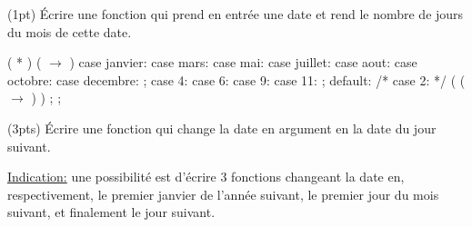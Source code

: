 \question (1pt) {\'E}crire une fonction  qui prend en
entr{\'e}e une date et rend le nombre de jours du mois de cette date.


\begin{petitsexemples}
\end{petitsexemples}

\begin{solution}
  \begin{Ccode}
    \ctab{}\cint 
    \ctab{} ( \cstruct {} *  )
    \ctab{}\lb
    \ctab{}     ( \ensuremath{\rightarrow} )
    \ctab{}      \lb
    \ctab{}      case janvier:
    \ctab{}      case mars:
    \ctab{}      case mai:
    \ctab{}      case juillet:
    \ctab{}      case aout:
    \ctab{}      case octobre:
    \ctab{}      case decembre:
    \ctab{}	 ;
    \ctab{}      case 4:
    \ctab{}      case 6:
    \ctab{}      case 9:
    \ctab{}      case 11:
    \ctab{}	 ;
    \ctab{}      default: /* case 2: */
    \ctab{}      \cif (  ( \ensuremath{\rightarrow} ) )
    \ctab{}	 ;
    \ctab{}      \celse
    \ctab{}	 ;
    \ctab{}    \rb
    \ctab{}\rb
  \end{Ccode}
\end{solution}

\question (3pts) {\'E}crire une fonction  qui change
la date en argument en la date du jour suivant.

\hspace*{5em}\parbox{0.8\linewidth}{\underline{Indication:} une
  possibilit{\'e} est d'{\'e}crire 3 fonctions changeant la date en,
  respectivement, le premier janvier de l'ann{\'e}e suivant, le premier
  jour du mois suivant, et finalement le jour suivant.}

\begin{petitsexemples}
\end{petitsexemples}

